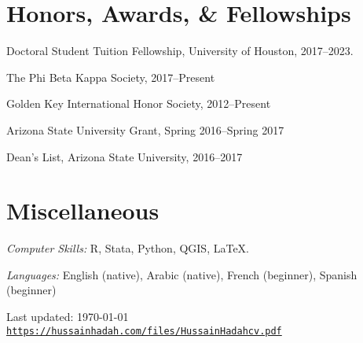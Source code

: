 \documentclass[10pt,letterpaper]{article}
\def\footerlink{https://hussainhadah.com/files/HussainHadahcv.pdf}
\renewenvironment{itemize}{
  \begin{list}{}{
    \setlength{\leftmargin}{1.5em}
  }
}{
  \end{list}
}
\begin{document}
\section*{Honors, Awards, \& Fellowships}
%
\begin{itemize}
\item Doctoral Student Tuition Fellowship, University of Houston, 2017--2023.
\item The Phi Beta Kappa Society, 2017--Present
\item Golden Key International Honor Society, 2012--Present
\item Arizona State University Grant, Spring 2016--Spring 2017
\item Dean's List, Arizona State University, 2016--2017
\end{itemize}


\section*{Miscellaneous}
%
\begin{itemize}
\item \textit{Computer Skills:} R, Stata, Python, QGIS, \LaTeX.
\item \textit{Languages:} English (native), Arabic (native), French (beginner), Spanish (beginner)
\end{itemize}
%
%

\bigskip

\begin{center}
  \begin{footnotesize}
    Last updated: \today \\
    \href{\footerlink}{\texttt{\footerlink}}
  \end{footnotesize}
\end{center}
\end{document}
